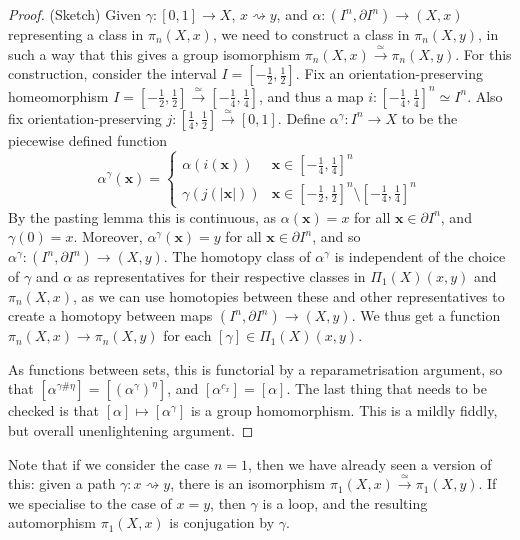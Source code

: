 \documentclass{tufte-handout}
\theoremstyle{definition}
\begin{document}
\begin{proof}
(Sketch) Given $\gamma\colon [0,1] \to X$, $x\rightsquigarrow y$, and $\alpha\colon (I^n,\partial I^n) \to (X,x)$ representing a class in $\pi_n(X,x)$, we need to construct a class in $\pi_n(X,y)$, in such a way that this gives a group isomorphism $\pi_n(X,x) \xrightarrow{\simeq} \pi_n(X,y)$. For this construction, consider the interval $I = [-\frac12,\frac12]$.
Fix an orientation-preserving homeomorphism $I = [-\frac12,\frac12]\xrightarrow{\simeq} [-\frac14,\frac14]$, and thus a map $i\colon [-\frac14,\frac14]^n  \simeq I^n $. Also fix orientation-preserving $j\colon [\frac14,\frac12]\xrightarrow{\simeq} [0,1]$.  Define $\alpha^\gamma\colon I^n \to X$ to be the piecewise defined function
\[
\alpha^\gamma(\mathbf{x}) = \begin{cases} 
\alpha(i(\mathbf{x})) & \mathbf{x} \in [-\frac14,\frac14]^n\\
\gamma(j(|\mathbf{x}|)) & \mathbf{x} \in [-\frac12,\frac12]^n \setminus [-\frac14,\frac14]^n
\end{cases}
\]
By the pasting lemma this is continuous, as $\alpha(\mathbf{x}) = x$ for all $\mathbf{x} \in \partial I^n$, and $\gamma(0) = x$. Moreover, $\alpha^\gamma(\mathbf{x}) = y$ for all $\mathbf{x} \in \partial I^n$, and so $\alpha^\gamma\colon (I^n,\partial I^n) \to (X,y)$. The homotopy class of $\alpha^\gamma$ is independent of the choice of $\gamma$ and $\alpha$ as representatives for their respective classes in $\Pi_1(X)(x,y)$ and $\pi_n(X,x)$, as we can use homotopies between these and other representatives to create a homotopy between maps $(I^n,\partial I^n) \to (X,y)$. We thus get a function $\pi_n(X,x) \to \pi_n(X,y)$ for each $[\gamma]\in \Pi_1(X)(x,y)$.

As functions between sets, this is functorial by a reparametrisation argument, so that $[\alpha^{\gamma\#\eta}] = [(\alpha^\gamma)^\eta]$, and $[\alpha^{c_x}] = [\alpha]$. The last thing that needs to be checked is that $[\alpha]\mapsto [\alpha^\gamma]$ is a group homomorphism. This is a mildly fiddly, but overall unenlightening argument.
\end{proof}

Note that if we consider the case $n=1$, then we have already seen a version of this: given a path $\gamma\colon x\rightsquigarrow y$, there is an isomorphism $\pi_1(X,x) \xrightarrow{\simeq} \pi_1(X,y)$. If we specialise to the case of $x=y$, then $\gamma$ is a loop, and the resulting automorphism $\pi_1(X,x)$ is conjugation by $\gamma$.
\end{document}
